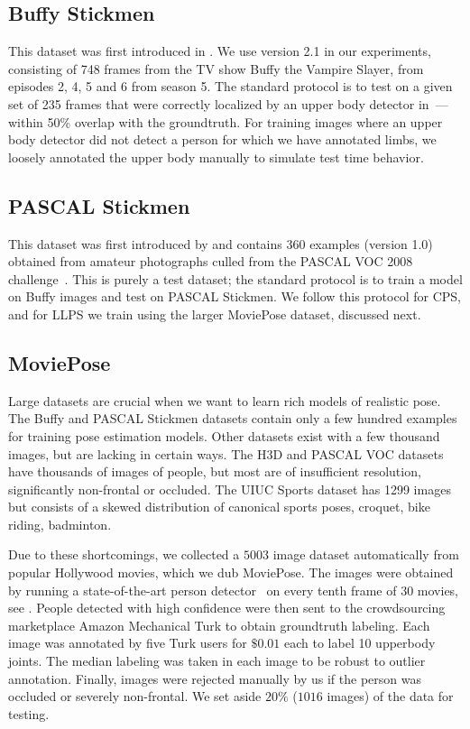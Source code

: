 \subsection{Buffy Stickmen}
This dataset was first introduced in \citet{ferrari08}.  We use version 2.1 in 
our experiments, consisting of 748 frames from the TV show Buffy the Vampire 
Slayer, from episodes 2, 4, 5 and 6 from season 5.  The standard protocol is to 
test on a given set of 235 frames that were correctly localized by an upper 
body detector in~\citet{ferrari08}---within 50\% overlap with the groundtruth.  
For training images where an upper body detector did not detect a person for 
which we have annotated limbs, we loosely annotated the upper body manually to 
simulate test time behavior.
  

\subsection{PASCAL Stickmen}  This dataset was first introduced by 
\citet{eichner09} and contains 360 examples (version 1.0) obtained from amateur 
photographs culled from the PASCAL VOC 2008 challenge~\citep{voc09}.  This is 
purely a test dataset; the standard protocol is to train a model on Buffy 
images and test on PASCAL Stickmen. We follow this protocol for CPS, and for 
LLPS we train using the larger MoviePose dataset, discussed next.

\subsection{MoviePose}
Large datasets are crucial when we want to learn rich models of realistic pose.
The Buffy and PASCAL Stickmen datasets contain only a few hundred examples for 
training pose estimation models.  Other datasets exist with a few thousand 
images, but are lacking in certain ways. The H3D \citep{poselets} and PASCAL 
VOC \citep{voc09} datasets have thousands of images of people, but most are of 
insufficient resolution, significantly non-frontal or occluded.  The UIUC 
Sports dataset \citep{wang2011} has 1299 images but consists of a skewed 
distribution of canonical sports poses, \eg croquet, bike riding, badminton.  

Due to these shortcomings, we collected a $5003$ image dataset automatically 
from popular Hollywood movies, which we dub MoviePose.  The images were 
obtained by running a state-of-the-art person detector~\citep{poselets} on 
every tenth frame of $30$ movies, see .  People detected with 
high confidence were then sent to the crowdsourcing marketplace Amazon 
Mechanical Turk to obtain groundtruth labeling.  Each image was annotated by 
five Turk users for $\$0.01$ each to label 10 upperbody joints.  The median 
labeling was taken in each image to be robust to outlier annotation.  Finally, 
images were rejected manually by us if the person was occluded or severely 
non-frontal.  We set aside $20\%$ ($1016$ images) of the data for testing.

